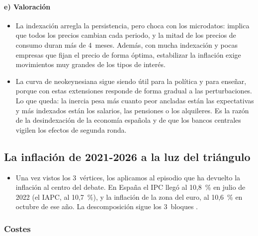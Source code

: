 \documentclass[11pt]{article}
\begin{document}
\paragraph{e) Valoración}

\begin{itemize}
\item La indexación arregla la persistencia, pero choca con los microdatos: implica que todos los precios cambian cada periodo, y la mitad de los precios de consumo duran más de 4~meses\nocite{BilsKlenow2004Some}. Además, con mucha indexación y pocas empresas que fijan el precio de forma óptima, estabilizar la inflación exige movimientos muy grandes de los tipos de interés.
\item La curva de  neokeynesiana sigue siendo útil para la política y para enseñar, porque con estas extensiones responde de forma gradual a las perturbaciones. Lo que queda: la inercia pesa más cuanto peor ancladas están las expectativas y más indexados están los salarios, las pensiones o los alquileres. Es la razón de la desindexación de la economía española\nocite{BOE2015Desindexacion} y de que los bancos centrales vigilen los efectos de segunda ronda.
\end{itemize}

\subsection{La inflación de 2021-2026 a la luz del triángulo}\label{sec:inflacion-reciente}

\begin{itemize}
\item Una vez vistos los 3~vértices, los aplicamos al episodio que ha devuelto la inflación al centro del debate. En España el IPC llegó al 10,8~\% en julio de 2022 (el IAPC, al 10,7~\%)\nocite{INE2026IPCSerie,Eurostat2026IAPC}, y la inflación de la zona del euro, al 10,6~\% en octubre de ese año\nocite{Eurostat2026IAPC}. La descomposición sigue los 3~bloques .
\end{itemize}

\subsubsection{Costes}\label{sec:reciente-costes}
\end{document}
